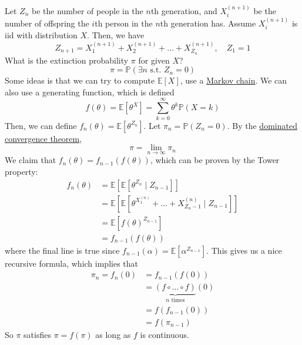   \begin{example}
    \label{ex:branching-processes}
    Let $Z_n$ be the number of people in the $n$th generation, and $X_i^{(n+1)}$ be the number of offspring the $i$th person in the $n$th generation has. Assume $X_i^{(n+1)}$ is iid with distribution $X$. Then, we have 
    \begin{equation}
      Z_{n+1} = X_1^{(n+1)} + X_2^{(n+1)} + \ldots + X_{Z_n}^{(n + 1)}, \quad Z_1 = 1
    \end{equation}
    What is the extinction probability $\pi$ for given $X$? 
    \begin{equation}
      \pi = \mathbb{P}(\exists n \text{ s.t. } Z_n = 0)
    \end{equation}
    Some ideas is that we can try to compute $\mathbb{E}[X]$, use a \hyperref[def:markov-chain]{Markov chain}. We can also use a generating function, which is defined 
    \begin{equation}
      f(\theta) = \mathbb{E} [\theta^X] = \sum_{k=0}^\infty \theta^k \mathbb{P}(X = k)
    \end{equation}
    Then, we can define $f_n (\theta) = \mathbb{E}[\theta^{Z_n}]$. Let $\pi_n = \mathbb{P}(Z_n = 0)$. By the \hyperref[mt-thm:dominated-convergence-theorem]{dominated convergence theorem}, 
    \begin{equation}
      \pi = \lim_{n \to \infty} \pi_n
    \end{equation} 
    We claim that $f_n (\theta) = f_{n-1} (f(\theta))$, which can be proven by the Tower property:
    \begin{align}
      f_n (\theta) & = \mathbb{E}[ \mathbb{E}[\theta^{Z_n} \mid Z_{n-1}]] \\ 
                   & = \mathbb{E}[ \mathbb{E}[\theta^{X_1^{(n)}} + \ldots + X_{Z_n - 1}^{(n)} \mid Z_{n-1}] ] \\ 
                   & = \mathbb{E}[f(\theta)^{Z_{n-1}}] \\ 
                   & = f_{n-1} (f(\theta))
    \end{align}
    where the final line is true since $f_{n-1} (\alpha) = \mathbb{E}[\alpha^{Z_{n-1}}]$. This gives us a nice recursive formula, which implies that 
    \begin{align}
      \pi_n = f_n (0) & = f_{n-1} (f (0))  \\
                      & = \underbrace{(f \circ \ldots \circ f)}_{n \text{ times}} (0) \\ 
                      & = f(f_{n-1} (0)) \\ 
                      & = f(\pi_{n-1}) 
    \end{align}
    So $\pi$ satisfies $\pi = f(\pi)$ as long as $f$ is continuous. 


\end{example}
